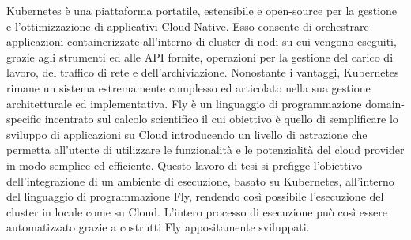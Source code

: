Kubernetes è una piattaforma portatile, estensibile e open-source per la gestione e l'ottimizzazione di applicativi Cloud-Native. Esso consente di orchestrare applicazioni containerizzate all'interno di cluster di nodi su cui vengono eseguiti, grazie agli strumenti ed alle API fornite, operazioni per la gestione del carico di lavoro, del traffico di rete e dell'archiviazione. Nonostante i vantaggi, Kubernetes rimane un sistema estremamente complesso ed articolato nella sua gestione architetturale ed implementativa. Fly è un linguaggio di programmazione domain-specific incentrato sul calcolo scientifico il cui obiettivo è quello di semplificare lo sviluppo di applicazioni su Cloud introducendo un livello di astrazione che permetta all'utente di utilizzare le funzionalità e le potenzialità del cloud provider in modo semplice ed efficiente. Questo lavoro di tesi si prefigge l'obiettivo dell'integrazione di un ambiente di esecuzione, basato su Kubernetes, all'interno del linguaggio di programmazione Fly, rendendo così possibile l'esecuzione del cluster in locale come su Cloud. L'intero processo di esecuzione può così essere automatizzato grazie a costrutti Fly appositamente sviluppati.